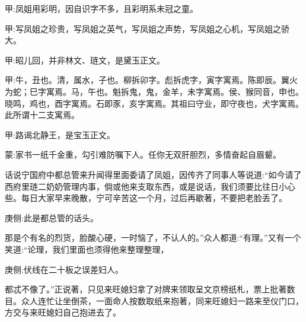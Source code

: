 
\begin{parag}
    \begin{note}甲:凤姐用彩明，因自识字不多，且彩明系未冠之童。\end{note}
\end{parag}


\begin{parag}
    \begin{note}甲:写凤姐之珍贵，写凤姐之英气，写凤姐之声势，写凤姐之心机，写凤姐之骄大。\end{note}
\end{parag}


\begin{parag}
    \begin{note}甲:昭儿回，并非林文、琏文，是黛玉正文。\end{note}
\end{parag}


\begin{parag}
    \begin{note}甲:牛，丑也。清，属水，子也。柳拆卯字。彪拆虎字，寅字寓焉。陈即辰。翼火为蛇；巳字寓焉。马，午也。魁拆鬼，鬼，金羊，未字寓焉。侯、猴同音，申也。晓鸣，鸡也，酉字寓焉。石即豕，亥字寓焉。其祖曰守业，即守夜也，犬字寓焉。此所谓十二支寓焉。\end{note}
\end{parag}


\begin{parag}
    \begin{note}甲:路谒北静王，是宝玉正文。\end{note}
\end{parag}


\begin{parag}
    \begin{note}蒙:家书一纸千金重，勾引难防嘱下人。任你无双肝胆烈，多情奋起自眉颦。\end{note}
\end{parag}


\begin{parag}
    话说宁国府中都总管来升闻得里面委请了凤姐，因传齐了同事人等说道:“如今请了西府里琏二奶奶管理内事，倘或他来支取东西，或是说话，我们须要比往日小心些。每日大家早来晚散，宁可辛苦这一个月，过后再歇著，不要把老脸丢了。\begin{note}庚侧:此是都总管的话头。\end{note}那是个有名的烈货，脸酸心硬，一时恼了，不认人的。”众人都道:“有理。”又有一个笑道:“论理，我们里面也须得他来整理整理，\begin{note}庚侧:伏线在二十板之误差妇人。\end{note}都忒不像了。”正说著，只见来旺媳妇拿了对牌来领取呈文京榜纸札，票上批著数目。众人连忙让坐倒茶，一面命人按数取纸来抱著，同来旺媳妇一路来至仪门口，方交与来旺媳妇自己抱进去了。
\end{parag}


